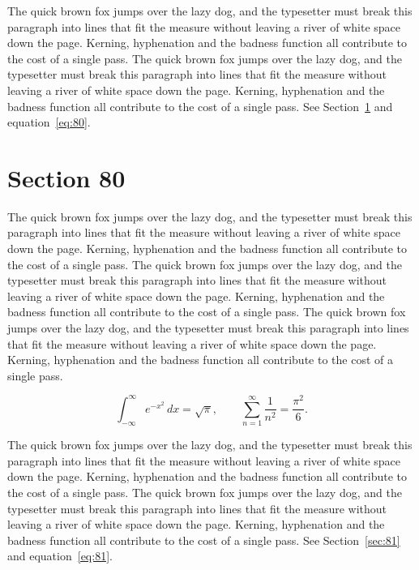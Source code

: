 \documentclass{article}
\begin{document}
The quick brown fox jumps over the lazy dog, and the typesetter must break this paragraph into lines that fit the measure without leaving a river of white space down the page. Kerning, hyphenation and the badness function all contribute to the cost of a single pass. The quick brown fox jumps over the lazy dog, and the typesetter must break this paragraph into lines that fit the measure without leaving a river of white space down the page. Kerning, hyphenation and the badness function all contribute to the cost of a single pass. 
See Section~\ref{sec:80} and equation~\eqref{eq:80}.
\section{Section 80}
\label{sec:80}
The quick brown fox jumps over the lazy dog, and the typesetter must break this paragraph into lines that fit the measure without leaving a river of white space down the page. Kerning, hyphenation and the badness function all contribute to the cost of a single pass. The quick brown fox jumps over the lazy dog, and the typesetter must break this paragraph into lines that fit the measure without leaving a river of white space down the page. Kerning, hyphenation and the badness function all contribute to the cost of a single pass. The quick brown fox jumps over the lazy dog, and the typesetter must break this paragraph into lines that fit the measure without leaving a river of white space down the page. Kerning, hyphenation and the badness function all contribute to the cost of a single pass. 

\begin{equation}\label{eq:80}
\int_{-\infty}^{\infty} e^{-x^{2}}\,dx = \sqrt{\pi}, \qquad
\sum_{n=1}^{\infty} \frac{1}{n^{2}} = \frac{\pi^{2}}{6}.
\end{equation}

The quick brown fox jumps over the lazy dog, and the typesetter must break this paragraph into lines that fit the measure without leaving a river of white space down the page. Kerning, hyphenation and the badness function all contribute to the cost of a single pass. The quick brown fox jumps over the lazy dog, and the typesetter must break this paragraph into lines that fit the measure without leaving a river of white space down the page. Kerning, hyphenation and the badness function all contribute to the cost of a single pass. 
See Section~\ref{sec:81} and equation~\eqref{eq:81}.
\end{document}
